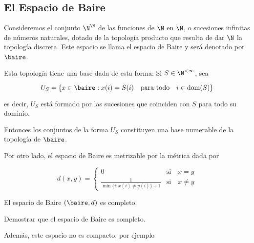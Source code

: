 \subsection{El Espacio de Baire}

\begin{defn}
    Consideremos el conjunto $\N^{\N}$ de las funciones de $\N$ en $\N$, o sucesiones infinitas de números naturales, dotado de la topología producto que resulta de dar $\N$ la topología discreta. Este espacio se llama \ul{el espacio de Baire} y será denotado por $\baire$.
\end{defn}

Esta topología tiene una base dada de esta forma: Si $S \in \N^{< \infty}$, sea

\[
U_S = \{ x \in \baire : x(i) = S(i) \quad \text{para todo} \quad i \in \operatorname{dom}(S) \}
\]

\noindent es decir, $U_S$ está formado por las sucesiones que coinciden con $S$ para todo su dominio.

Entonces los conjuntos de la forma $U_S$ constituyen una base numerable de la topología de $\baire$.

Por otro lado, el espacio de Baire es metrizable por la métrica dada por

\[
d(x,y) = \begin{cases}
            0& \text{si} \quad x=y \\
            \displaystyle \frac{1}{\min\{i : x(i) \neq y(i)\} + 1}& \text{si} \quad x \neq y
        \end{cases}
\]

El espacio de Baire $(\baire, d)$ es completo.

\begin{ejer}
    Demostrar que el espacio de Baire es completo.
\end{ejer}


Además, este espacio no es compacto, por ejemplo


